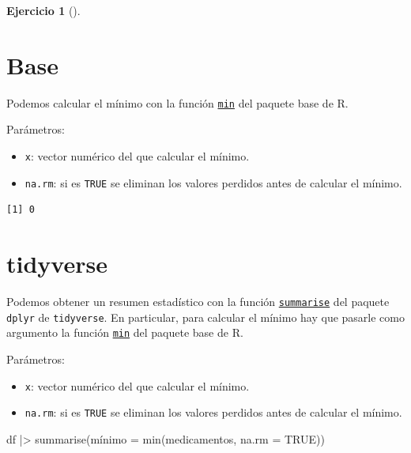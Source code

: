 \documentclass[
  spanish,
  a4paper,
]{scrreport}
\newenvironment{Shaded}{\begin{snugshade}}{\end{snugshade}}
\newcommand{\AttributeTok}[1]{\textcolor[rgb]{0.40,0.45,0.13}{#1}}
\newcommand{\ConstantTok}[1]{\textcolor[rgb]{0.56,0.35,0.01}{#1}}
\newcommand{\FunctionTok}[1]{\textcolor[rgb]{0.28,0.35,0.67}{#1}}
\newcommand{\NormalTok}[1]{\textcolor[rgb]{0.00,0.23,0.31}{#1}}
\newcommand{\OtherTok}[1]{\textcolor[rgb]{0.00,0.23,0.31}{#1}}
\newcommand{\SpecialCharTok}[1]{\textcolor[rgb]{0.37,0.37,0.37}{#1}}
\providecommand{\tightlist}{%
  \setlength{\itemsep}{0pt}\setlength{\parskip}{0pt}}
\theoremstyle{definition}
\newtheorem{exercise}{Ejercicio}[chapter]
\theoremstyle{remark}
\begin{document}
\begin{exercise}[]
\begin{enumerate}
\begin{tcolorbox}
  \section{Base}

  Podemos calcular el mínimo con la función
  \href{https://www.rdocumentation.org/packages/base/versions/3.6.2/topics/min}{\texttt{min}}
  del paquete base de R.

  Parámetros:

  \begin{itemize}
  \tightlist
  \item
    \texttt{x}: vector numérico del que calcular el mínimo.
  \item
    \texttt{na.rm}: si es \texttt{TRUE} se eliminan los valores perdidos
    antes de calcular el mínimo.
  \end{itemize}

\begin{Shaded}
\end{Shaded}

\begin{verbatim}
[1] 0
\end{verbatim}

  \section{tidyverse}

  Podemos obtener un resumen estadístico con la función
  \href{https://dplyr.tidyverse.org/reference/summarise.html}{\texttt{summarise}}
  del paquete \texttt{dplyr} de \texttt{tidyverse}. En particular, para
  calcular el mínimo hay que pasarle como argumento la función
  \href{https://www.rdocumentation.org/packages/base/versions/3.6.2/topics/min}{\texttt{min}}
  del paquete base de R.

  Parámetros:

  \begin{itemize}
  \tightlist
  \item
    \texttt{x}: vector numérico del que calcular el mínimo.
  \item
    \texttt{na.rm}: si es \texttt{TRUE} se eliminan los valores perdidos
    antes de calcular el mínimo.
  \end{itemize}

\begin{Shaded}
\begin{Highlighting}[]
\NormalTok{df }\SpecialCharTok{|\textgreater{}} \FunctionTok{summarise}\NormalTok{(mínimo }\OtherTok{=} \FunctionTok{min}\NormalTok{(medicamentos, }\AttributeTok{na.rm =} \ConstantTok{TRUE}\NormalTok{))}
\end{Highlighting}
\end{Shaded}


\end{tcolorbox}
\end{enumerate}
\end{exercise}
\end{document}
